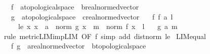 \begin{isabellebody}
\ \ \ f\ {\isacharcolon}{\kern0pt}{\isacharcolon}{\kern0pt}\ {\isachardoublequoteopen}{\isacharprime}{\kern0pt}a{\isacharcolon}{\kern0pt}{\isacharcolon}{\kern0pt}topological{\isacharunderscore}{\kern0pt}space\ {\isasymRightarrow}\ {\isacharprime}{\kern0pt}b{\isacharcolon}{\kern0pt}{\isacharcolon}{\kern0pt}real{\isacharunderscore}{\kern0pt}normed{\isacharunderscore}{\kern0pt}vector{\isachardoublequoteclose}\isanewline
\ \ \ g\ {\isacharcolon}{\kern0pt}{\isacharcolon}{\kern0pt}\ {\isachardoublequoteopen}{\isacharprime}{\kern0pt}a{\isacharcolon}{\kern0pt}{\isacharcolon}{\kern0pt}topological{\isacharunderscore}{\kern0pt}space\ {\isasymRightarrow}\ {\isacharprime}{\kern0pt}c{\isacharcolon}{\kern0pt}{\isacharcolon}{\kern0pt}real{\isacharunderscore}{\kern0pt}normed{\isacharunderscore}{\kern0pt}vector{\isachardoublequoteclose}\isanewline
\ \ \ f{\isacharcolon}{\kern0pt}\ {\isachardoublequoteopen}f\ {\isasymmidarrow}a{\isasymrightarrow}\ l{\isachardoublequoteclose}\isanewline
\ \ \ \ \ le{\isacharcolon}{\kern0pt}\ {\isachardoublequoteopen}{\isasymAnd}x{\isachardot}{\kern0pt}\ x\ {\isasymnoteq}\ a\ {\isasymLongrightarrow}\ norm\ {\isacharparenleft}{\kern0pt}g\ x\ {\isacharminus}{\kern0pt}\ m{\isacharparenright}{\kern0pt}\ {\isasymle}\ norm\ {\isacharparenleft}{\kern0pt}f\ x\ {\isacharminus}{\kern0pt}\ l{\isacharparenright}{\kern0pt}{\isachardoublequoteclose}\isanewline
\ \ \ {\isachardoublequoteopen}g\ {\isasymmidarrow}a{\isasymrightarrow}\ m{\isachardoublequoteclose}\isanewline
%
\isadelimproof
\ \ %
\endisadelimproof
%
\isatagproof
{}\isamarkupfalse%
\ {\isacharparenleft}{\kern0pt}rule\ metric{\isacharunderscore}{\kern0pt}LIM{\isacharunderscore}{\kern0pt}imp{\isacharunderscore}{\kern0pt}LIM\ {\isacharbrackleft}{\kern0pt}OF\ f{\isacharbrackright}{\kern0pt}{\isacharparenright}{\kern0pt}\ {\isacharparenleft}{\kern0pt}simp\ add{\isacharcolon}{\kern0pt}\ dist{\isacharunderscore}{\kern0pt}norm\ le{\isacharparenright}{\kern0pt}%
\endisatagproof
{\isafoldproof}%
%
\isadelimproof
\isanewline
%
\endisadelimproof
\isanewline
{}\isamarkupfalse%
\ LIM{\isacharunderscore}{\kern0pt}equal{}{\isacharcolon}{\kern0pt}\isanewline
\ \ \ f\ g\ {\isacharcolon}{\kern0pt}{\isacharcolon}{\kern0pt}\ {\isachardoublequoteopen}{\isacharprime}{\kern0pt}a{\isacharcolon}{\kern0pt}{\isacharcolon}{\kern0pt}real{\isacharunderscore}{\kern0pt}normed{\isacharunderscore}{\kern0pt}vector\ {\isasymRightarrow}\ {\isacharprime}{\kern0pt}b{\isacharcolon}{\kern0pt}{\isacharcolon}{\kern0pt}topological{\isacharunderscore}{\kern0pt}space{\isachardoublequoteclose}\isanewline

\end{isabellebody}
